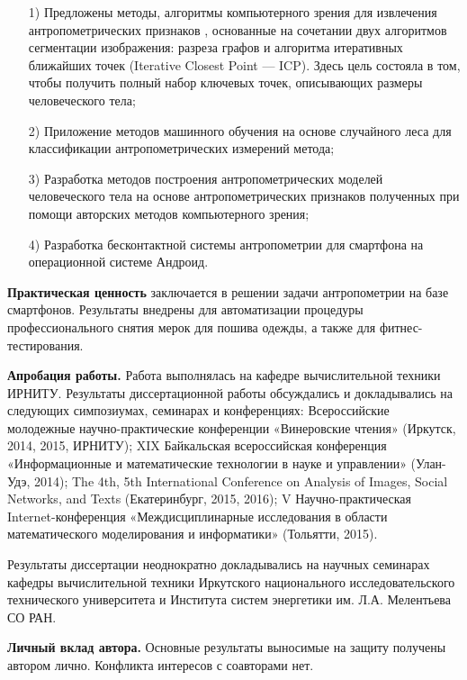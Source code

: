 \begin{enumerate}
	\item[1)] Предложены методы, алгоритмы компьютерного зрения для извлечения антропометрических признаков , основанные на сочетании двух алгоритмов сегментации изображения: разреза графов и алгоритма итеративных ближайших точек (Iterative Closest Point — ICP). Здесь цель состояла в том, чтобы получить полный набор ключевых точек, описывающих размеры человеческого тела;
	\item[2)] Приложение методов машинного обучения на основе случайного леса для классификации антропометрических измерений метода;
	\item[3)] Разработка методов построения антропометрических моделей человеческого тела на основе антропометрических признаков полученных при помощи авторских методов компьютерного зрения;
	\item[4)] Разработка бесконтактной системы антропометрии для смартфона на операционной системе Андроид.
\end{enumerate}
	
\textbf{Практическая ценность} заключается в решении задачи антропометрии на базе смартфонов. Результаты внедрены для автоматизации процедуры профессионального снятия мерок для пошива одежды, а также для фитнес-тестирования.

\textbf{Апробация работы.} Работа выполнялась на кафедре вычислительной техники ИРНИТУ. Результаты диссертационной работы обсуждались и докладывались на следующих симпозиумах, семинарах и конференциях: Всероссийские молодежные научно-практические конференции «Винеровские чтения» (Иркутск, 2014, 2015, ИРНИТУ); XIX Байкальская всероссийская конференция «Информационные и математические технологии в науке и управлении» (Улан-Удэ, 2014); The 4th, 5th International Conference on Analysis of Images, Social Networks, and Texts (Екатеринбург, 2015, 2016); V Научно-практическая Internet-конференция «Междисциплинарные исследования в области математического моделирования и информатики» (Тольятти, 2015).

Результаты диссертации неоднократно докладывались на научных семинарах кафедры вычислительной техники Иркутского национального исследовательского технического университета и Института систем энергетики им. Л.А. Мелентьева СО РАН.


\textbf{Личный вклад автора.} Основные результаты выносимые на защиту получены автором лично. Конфликта интересов с соавторами нет.

